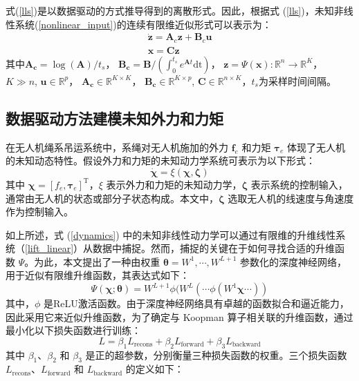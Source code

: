 \documentclass[lang=chs, degree=master, blindreview=false, winfonts=true]{yanputhesis}
\begin{document}
式(\ref{lls})是以数据驱动的方式推导得到的离散形式。因此，根据式 (\ref{lls})，未知非线性系统(\ref{nonlinear_input})的连续有限维近似形式可以表示为：
\begin{equation}
	\begin{gathered}\dot{\boldsymbol{z}}=\boldsymbol{A}_{c}\boldsymbol{z}+\boldsymbol{B}_{c}\boldsymbol{u}\\\boldsymbol{x}=\boldsymbol{C}\boldsymbol{z}\end{gathered}
	\label{lift_linear}
\end{equation}
其中$\bm{A_c}=\log(\bm{A})/t_s$， $\bm{B_c}=\bm{B}/(\int_{0}^{t_s}e^{\bm{A}t}\text{dt})$， $\bm{z} = {\Psi}(\bm{x}):\mathbb{R}^n \rightarrow \mathbb{R}^K$， $K\gg n$, $\bm{u}\in \mathbb{R}^p$， $\bm{A_c} \in \mathbb{R}^{K\times K}$，  $\bm{B_c} \in \mathbb{R}^{K\times p}$, $\bm{C} \in \mathbb{R}^{n\times K}$，$t_s$为采样时间间隔。

\subsection{数据驱动方法建模未知外力和力矩}
在无人机绳系吊运系统中，系绳对无人机施加的外力 $\bm{f}_e$ 和力矩 $\bm{\tau}_e$ 体现了无人机的未知动态特性。假设外力和力矩的未知动力学系统可表示为以下形式：
\begin{equation}
	\dot{\bm \chi} = {\xi}(\bm \chi,\bm \zeta) \label{dynamics}
\end{equation}
其中 $\bm \chi = [f_e, \bm \tau_e]^\mathrm{T}$，${\xi}$ 表示外力和力矩的未知动力学，$\bm{\zeta}$ 表示系统的控制输入，通常由无人机的状态或部分子状态构成。本文中，$\bm{\zeta}$ 选取无人机的线速度与角速度作为控制输入。

如上所述，式 (\ref{dynamics}) 中的未知非线性动力学可以通过有限维的升维线性系统（\autoref{lift_linear}）从数据中捕捉。然而，捕捉的关键在于如何寻找合适的升维函数 ${\Psi}$。为此，本文提出了一种由权重 $\bm{\theta} = {W^1, \cdots, W^{L+1}}$ 参数化的深度神经网络，用于近似有限维升维函数，其表达式如下：
\begin{equation}
	{\Psi}(\bm \chi;\bm{\theta}) = W^{L+1}\phi(W^L(\cdots \phi(W^1 \bm \chi \cdots)) \label{dnn}
\end{equation}
其中，$\phi$ 是ReLU激活函数。由于深度神经网络具有卓越的函数拟合和逼近能力，因此采用它来近似升维函数，为了确定与 Koopman 算子相关联的升维函数，通过最小化以下损失函数进行训练：
\begin{equation}
	L = \beta_1 L_{\text{recons}} + \beta_2 L_{\text{forward}} + \beta_3 L_{\text{backward}}
\end{equation}
其中 $\beta_1$、$\beta_2$ 和 $\beta_3$ 是正的超参数，分别衡量三种损失函数的权重。三个损失函数 $L_{\text{recons}}$、$L_{\text{forward}}$ 和 $L_{\text{backward}}$ 的定义如下：
\end{document}
